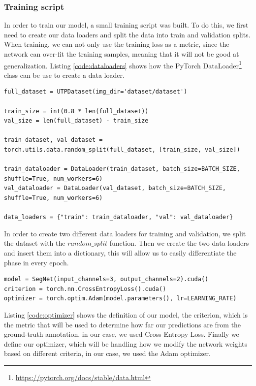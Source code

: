 \subsubsection{Training script}
\label{sec:train_script}

In order to train our model, a small training script was built. To do this, we first need to create our data loaders and split the data into train and validation splits. When training, we can not only use the training loss as a metric, since the network can over-fit the training samples, meaning that it will not be good at generalization. Listing \ref{code:dataloaders} shows how the PyTorch DataLoader\footnote{\url{https://pytorch.org/docs/stable/data.html}} class can be use to create a data loader.

\begin{lstlisting}[style=Python-color, caption=Data loaders and train-val split, frame=single, label=code:dataloaders]
full_dataset = UTPDataset(img_dir='dataset/dataset')

train_size = int(0.8 * len(full_dataset))
val_size = len(full_dataset) - train_size

train_dataset, val_dataset = torch.utils.data.random_split(full_dataset, [train_size, val_size])

train_dataloader = DataLoader(train_dataset, batch_size=BATCH_SIZE, shuffle=True, num_workers=6)
val_dataloader = DataLoader(val_dataset, batch_size=BATCH_SIZE, shuffle=True, num_workers=6)

data_loaders = {"train": train_dataloader, "val": val_dataloader}

\end{lstlisting}

In order to create two different data loaders for training and validation, we split the dataset with the $random\_split$ function. Then we create the two data loaders and insert them into a dictionary, this will allow us to easily differentiate the phase in every epoch.

\begin{lstlisting}[style=Python-color, caption=Model criterion and optimizer definition, frame=single, label=code:optimizer]
model = SegNet(input_channels=3, output_channels=2).cuda()
criterion = torch.nn.CrossEntropyLoss().cuda()
optimizer = torch.optim.Adam(model.parameters(), lr=LEARNING_RATE)

\end{lstlisting}

Listing \ref{code:optimizer} shows the definition of our model, the criterion, which is the metric that will be used to determine how far our predictions are from the ground-truth annotation, in our case, we used Cross Entropy Loss. Finally we define our optimizer, which will be handling how we modify the network weights based on different criteria, in our case, we used the Adam optimizer.

